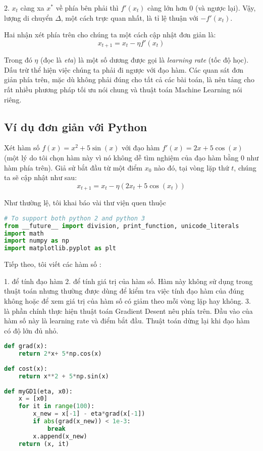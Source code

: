 2. $x_t$ càng xa $x^*$ về phía bên phải thì $f'(x_t)$ càng lớn hơn 0 (và ngược lại). Vậy, lượng di chuyển $\Delta$, một cách trực quan nhất, là tỉ lệ thuận với $-f'(x_t)$.  
 
Hai nhận xét phía trên cho chúng ta một cách cập nhật đơn giản là: 
\begin{equation*} 
x_{t+1} = x_t - \eta f'(x_t) 
\end{equation*} 
 
Trong đó $\eta$ (đọc là \textit{eta}) là một số dương được gọi là \textit{learning rate} (tốc độ học). Dấu trừ thể hiện việc chúng ta phải đi ngược với đạo hàm. Các quan sát đơn giản phía trên, mặc dù không phải đúng cho tất cả các bài toán, là nên tảng cho rất nhiều phương pháp tối ưu nói chung và thuật toán Machine Learning nói riêng.  
 
 
\subsection{Ví dụ đơn giản với Python}
 
Xét hàm số $f(x) = x^2 + 5\sin(x)$ với đạo hàm $f'(x) = 2x + 5\cos(x)$ (một lý do tôi chọn hàm này vì nó không dễ tìm nghiệm của đạo hàm bằng 0 như hàm phía trên). Giả sử bắt đầu từ một điểm $x_{0}$ nào đó, tại vòng lặp thứ $t$, chúng ta sẽ cập nhật như sau: 
\begin{equation*} 
x_{t+1} = x_t - \eta(2x_t + 5\cos(x_t)) 
\end{equation*} 
 
Như thường lệ, tôi khai báo vài thư viện quen thuộc 
 
 
\begin{lstlisting}[language=Python]
# To support both python 2 and python 3 
from __future__ import division, print_function, unicode_literals 
import math 
import numpy as np  
import matplotlib.pyplot as plt 
\end{lstlisting}
 
Tiếp theo, tôi viết các hàm số : 
 
1.  để tính đạo hàm 
2.  để tính giá trị của hàm số. Hàm này không sử dụng trong thuật toán nhưng thường được dùng để kiểm tra việc tính đạo hàm của đúng không hoặc để xem giá trị của hàm số có giảm theo mỗi vòng lặp hay không. 
3.  là phần chính thực hiện thuật toán Gradient Desent nêu phía trên. Đầu vào của hàm số này là learning rate và điểm bắt đầu. Thuật toán dừng lại khi đạo hàm có độ lớn đủ nhỏ. 
 
 
\begin{lstlisting}[language=Python]
def grad(x): 
    return 2*x+ 5*np.cos(x) 
 
def cost(x): 
    return x**2 + 5*np.sin(x) 
 
def myGD1(eta, x0): 
    x = [x0] 
    for it in range(100): 
        x_new = x[-1] - eta*grad(x[-1]) 
        if abs(grad(x_new)) < 1e-3: 
            break 
        x.append(x_new) 
    return (x, it) 
\end{lstlisting}
 
